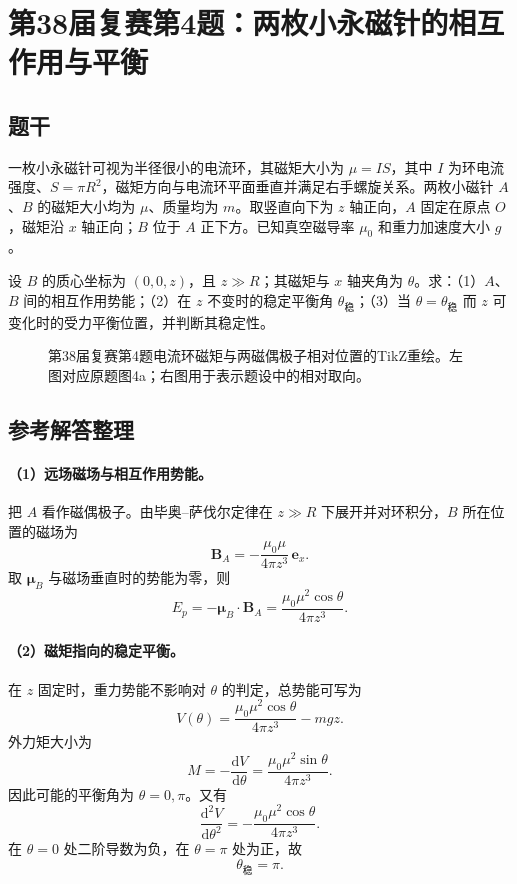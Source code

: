 \section{第38届复赛第4题：两枚小永磁针的相互作用与平衡}

\subsection{题干}
一枚小永磁针可视为半径很小的电流环，其磁矩大小为 $\mu=IS$，其中 $I$ 为环电流强度、$S=\pi R^2$，磁矩方向与电流环平面垂直并满足右手螺旋关系。两枚小磁针 $A$、$B$ 的磁矩大小均为 $\mu$、质量均为 $m$。取竖直向下为 $z$ 轴正向，$A$ 固定在原点 $O$，磁矩沿 $x$ 轴正向；$B$ 位于 $A$ 正下方。已知真空磁导率 $\mu_0$ 和重力加速度大小 $g$。

设 $B$ 的质心坐标为 $(0,0,z)$，且 $z\gg R$；其磁矩与 $x$ 轴夹角为 $\theta$。求：（1）$A$、$B$ 间的相互作用势能；（2）在 $z$ 不变时的稳定平衡角 $\theta_{\text{稳}}$；（3）当 $\theta=\theta_{\text{稳}}$ 而 $z$ 可变化时的受力平衡位置，并判断其稳定性。
\begin{figure}[htbp]
  \centering
  
  \caption{第38届复赛第4题电流环磁矩与两磁偶极子相对位置的TikZ重绘。左图对应原题图4a；右图用于表示题设中的相对取向。}
  \label{fig:cpho38q04}
\end{figure}

\subsection{参考解答整理}
\paragraph{（1）远场磁场与相互作用势能。}
把 $A$ 看作磁偶极子。由毕奥--萨伐尔定律在 $z\gg R$ 下展开并对环积分，$B$ 所在位置的磁场为
\[
\mathbf B_A=-\frac{\mu_0\mu}{4\pi z^3}\,\mathbf e_x.
\]
取 $\boldsymbol\mu_B$ 与磁场垂直时的势能为零，则
\[
\boxed{E_p=-\boldsymbol\mu_B\cdot\mathbf B_A
=\frac{\mu_0\mu^2\cos\theta}{4\pi z^3}.}
\]

\paragraph{（2）磁矩指向的稳定平衡。}
在 $z$ 固定时，重力势能不影响对 $\theta$ 的判定，总势能可写为
\[
V(\theta)=\frac{\mu_0\mu^2\cos\theta}{4\pi z^3}-mgz.
\]
外力矩大小为
\[
M=-\frac{\mathrm dV}{\mathrm d\theta}
=\frac{\mu_0\mu^2\sin\theta}{4\pi z^3}.
\]
因此可能的平衡角为 $\theta=0,\pi$。又有
\[
\frac{\mathrm d^2V}{\mathrm d\theta^2}
=-\frac{\mu_0\mu^2\cos\theta}{4\pi z^3}.
\]
在 $\theta=0$ 处二阶导数为负，在 $\theta=\pi$ 处为正，故
\[
\boxed{\theta_{\text{稳}}=\pi.}
\]

